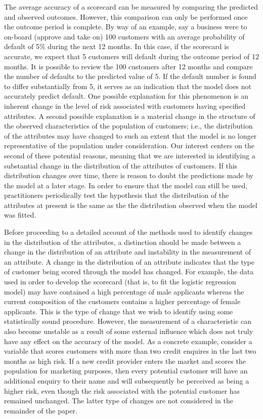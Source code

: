 \documentclass{article}
\theoremstyle{def}
\begin{document}
The average accuracy of a scorecard can be measured by comparing the predicted and observed outcomes. However, this comparison can only be performed once the outcome period is complete. By way of an example, say a business were to on-board (approve and take on) 100 customers with an average probability of default of 5\% during the next 12 months. In this case, if the scorecard is accurate, we expect that 5 customers will default during the outcome period of 12 months. It is possible to review the 100 customers after 12 months and compare the number of defaults to the predicted value of 5. If the default number is found to differ substantially from 5, it serves as an indication that the model does not accurately predict default. One possible explanation for this phenomenon is an inherent change in the level of risk associated with customers having specified attributes. A second possible explanation is a material change in the structure of the observed characteristics of the population of customers; i.e., the distribution of the attributes may have changed to such an extent that the model is no longer representative of the population under consideration. Our interest centers on the second of these potential reasons, meaning that we are interested in identifying a substantial change in the distribution of the attributes of customers. If this distribution changes over time, there is reason to doubt the predictions made by the model at a later stage. In order to ensure that the model can still be used, practitioners periodically test the hypothesis that the distribution of the attributes at present is the same as the the distribution observed when the model was fitted.

Before proceeding to a detailed account of the methods used to identify changes in the distribution of the attributes, a distinction should be made between a change in the distribution of an attribute and instability in the measurement of an attribute. A change in the distribution of an attribute indicates that the type of customer being scored through the model has changed. For example, the data used in order to develop the scorecard (that is, to fit the logistic regression model) may have contained a high percentage of male applicants whereas the current composition of the customers contains a higher percentage of female applicants. This is the type of change that we wish to identify using some statistically sound procedure. However, the measurement of a characteristic can also become unstable as a result of some external influence which does not truly have any effect on the accuracy of the model. As a concrete example, consider a variable that scores customers with more than two credit enquires in the last two months as high risk. If a new credit provider enters the market and scores the population for marketing purposes, then every potential customer will have an additional enquiry to their name and will subsequently be perceived as being a higher risk, even though the risk associated with the potential customer has remained unchanged. The latter type of changes are not considered in the remainder of the paper.
\end{document}
